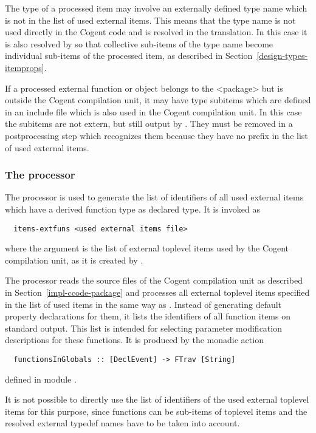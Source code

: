 The type of a processed item may involve an externally defined type name which is not in the list of used external items.
This means that the type name is not used directly in the Cogent code and is resolved in the translation. In this case it is 
also resolved by  so that collective sub-items of the type name become individual sub-items of 
the processed item, as described in Section~\ref{design-types-itemprops}.

If a processed external function or object belongs to the <package> but is outside the Cogent compilation unit, it may
have type subitems which are defined in an include file which is also used in the Cogent compilation unit. In this
case the subitems are not extern, but still output by . They must be removed in a postprocessing
step which recognizes them because they have no prefix in the list of used external items.

\subsubsection{The processor }

The processor  is used to generate the list of identifiers of all used external items which 
have a derived function type as declared type. It is invoked as
\begin{verbatim}
  items-extfuns <used external items file>
\end{verbatim}
where the argument is the list of external toplevel items used by the Cogent compilation unit, as it is created 
by .

The processor reads the source files of the Cogent compilation unit as described in Section~\ref{impl-ccode-package}
and processes all external toplevel items specified in the list of used items in the same way as .
Instead of generating default property declarations for them, it lists the identifiers of all function items on 
standard output. This list is intended for selecting parameter modification descriptions for these functions. It
is produced by the monadic action
\begin{verbatim}
  functionsInGlobals :: [DeclEvent] -> FTrav [String]
\end{verbatim}
defined in module .

It is not possible to directly use the list of identifiers of the used external toplevel items for this purpose, since 
functions can be sub-items of toplevel items and the resolved external typedef names have to be taken into account.

